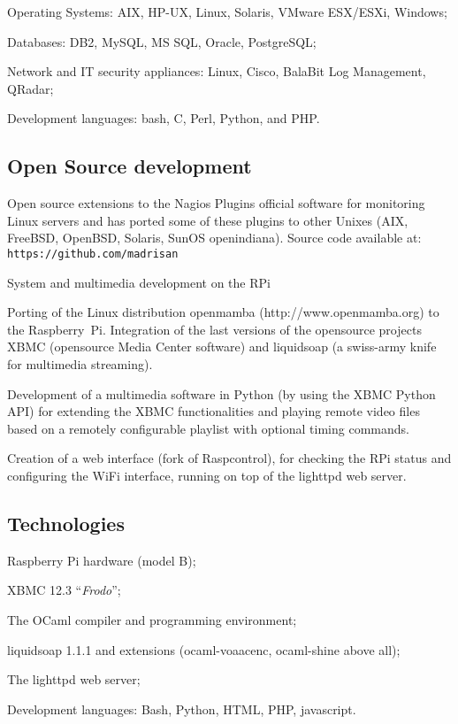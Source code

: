 \item{\bdot} Operating Systems: AIX, HP-UX, Linux, Solaris, VMware ESX/ESXi, Windows;
\item{\bdot} Databases: DB2, MySQL, MS SQL, Oracle, PostgreSQL;
\item{\bdot} Network and IT security appliances: Linux, Cisco, BalaBit Log Management, 
   QRadar;
\item{\bdot} Development languages: bash, C, Perl, Python, and PHP.

\subsection{Open Source development}

\noindent
Open source extensions to the 
Nagios Plugins official software for monitoring Linux servers and has ported
some of these plugins to other Unixes (AIX, FreeBSD, OpenBSD, Solaris, 
SunOS openindiana).
Source code available at: {\tt https://github.com/madrisan}


\bigskip
{}
   {System and multimedia development on the RPi}

\noindent
Porting of the Linux distribution openmamba 
({\rm http:/\negthinspace/www.openmamba.org}) to the Raspberry~Pi.
Integration of the last versions of the opensource projects XBMC 
(opensource Media Center software) and liquidsoap 
(a swiss-army knife for multimedia streaming).

Development of a multimedia software in Python (by using the XBMC Python API)
for extending the XBMC functionalities and playing remote video files based on
a remotely configurable playlist with optional timing commands.

Creation of a web interface (fork of Raspcontrol), for checking the RPi status
and configuring the WiFi interface, running on top of the lighttpd web server.

\subsection{Technologies}

\item{\bdot} Raspberry Pi hardware (model B);
\item{\bdot} XBMC 12.3 ``{\it Frodo\/}'';
\item{\bdot} The OCaml compiler and programming environment;
\item{\bdot} liquidsoap 1.1.1 and extensions (ocaml-voaacenc, ocaml-shine above all);
\item{\bdot} The lighttpd web server;
\item{\bdot} Development languages: Bash, Python, HTML, PHP, javascript.


